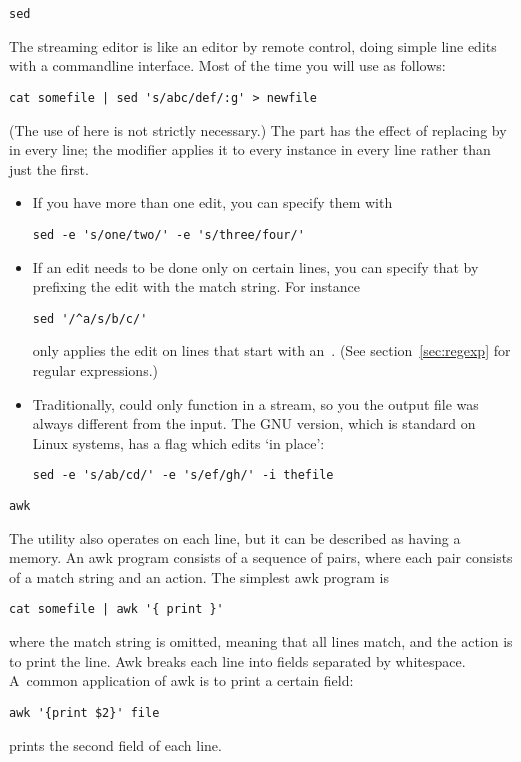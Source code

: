  {\tt sed}

The streaming editor  is like an editor by remote control,
doing simple line edits with a commandline interface. Most of the time
you will use  as follows:
\begin{verbatim}
cat somefile | sed 's/abc/def/:g' > newfile
\end{verbatim}
(The use of  here is not strictly necessary.)
The  part has the effect of replacing  by 
in every line; the  modifier applies it to every instance in
every line rather than just the first.

\begin{itemize}
\item If you have more than one edit, you can specify them with
\begin{verbatim}
sed -e 's/one/two/' -e 's/three/four/'
\end{verbatim}
\item If an edit needs to be done only on certain lines, you can
  specify that by prefixing the edit with the match string. For instance
\begin{verbatim}
sed '/^a/s/b/c/'
\end{verbatim}
only applies the edit on lines that start with an~. (See
section~\ref{sec:regexp} for regular expressions.)
\item Traditionally,  could only function in a stream, so you
  the output file was always different from the input. The GNU
  version, which is standard on Linux systems, has a flag  which
  edits `in place':
\begin{verbatim}
sed -e 's/ab/cd/' -e 's/ef/gh/' -i thefile
\end{verbatim}
\end{itemize}

 {\tt awk}

The  utility also operates on each line, but it can be
described as having a memory. An awk program consists of a sequence of
pairs, where each pair consists of a match string and an action. The
simplest awk program is
\begin{verbatim}
cat somefile | awk '{ print }'
\end{verbatim}
where the match string is omitted, meaning that all lines match, and
the action is to print the line. Awk breaks each line into fields
separated by whitespace. A~common application of awk is to print a
certain field:
\begin{verbatim}
awk '{print $2}' file
\end{verbatim}
prints the second field of each line.

